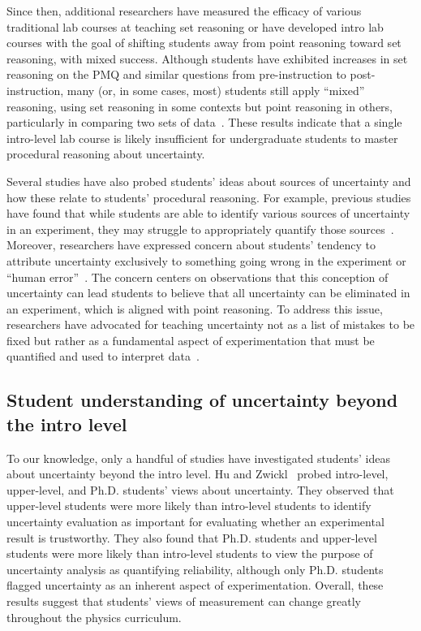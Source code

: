 \documentclass[english,aps,prstper,reprint,showpacs,longbibliography,superscriptaddress,nofootinbib]{revtex4-2}
\begin{document}
Since then, additional researchers have measured the efficacy of various traditional lab courses at teaching set reasoning or have developed intro lab courses with the goal of shifting students away from point reasoning toward set reasoning, with mixed success. Although students have exhibited increases in set reasoning on the PMQ and similar questions from pre-instruction to post-instruction, many (or, in some cases, most) students still apply ``mixed'' reasoning, using set reasoning in some contexts but point reasoning in others, particularly in comparing two sets of data~\cite{Kung2005,Volkwyn2008,Wan2022,Pollard2020,Kung2006,Pillay2008}. These results indicate that a single intro-level lab course is likely insufficient for undergraduate students to master procedural reasoning about uncertainty.

Several studies have also probed students' ideas about sources of uncertainty and how these relate to students' procedural reasoning. For example, previous studies have found that while students are able to identify various sources of uncertainty in an experiment, they may struggle to appropriately quantify those sources~\cite{Etkina2008,Sere1993}. Moreover, researchers have expressed concern about students' tendency to attribute uncertainty exclusively to something going wrong in the experiment or ``human error''~\cite{Hu2018,Holmes2015,Sere2001,Evangelinos2002,Allie2003}. The concern centers on observations that this conception of uncertainty can lead students to believe that all uncertainty can be eliminated in an experiment, which is aligned with point reasoning. To address this issue, researchers have advocated for teaching uncertainty not as a list of mistakes to be fixed but rather as a fundamental aspect of experimentation that must be quantified and used to interpret data~\cite{Evangelinos1999,Evangelinos2002,Allie2003,Pillay2008,Buffler2008}.

\subsection{Student understanding of uncertainty beyond the intro level}

To our knowledge, only a handful of studies have investigated students' ideas about uncertainty beyond the intro level. Hu and Zwickl~\cite{Hu2018} probed intro-level, upper-level, and Ph.D. students' views about uncertainty. They observed that upper-level students were more likely than intro-level students to identify uncertainty evaluation as important for evaluating whether an experimental result is trustworthy. They also found that Ph.D. students and upper-level students were more likely than intro-level students to view the purpose of uncertainty analysis as quantifying reliability, although only Ph.D. students flagged uncertainty as an inherent aspect of experimentation. Overall, these results suggest that students' views of measurement can change greatly throughout the physics curriculum.
\end{document}
